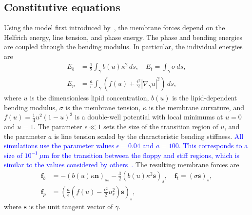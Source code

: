 \documentclass[twoside,twocolumn,9pt]{article}
\newcommand{\ff}{\mathbf{f}}
\newcommand{\nn}{\mathbf{n}}
\renewcommand{\ss}{\mathbf{s}}
\begin{document}
\subsection{Constitutive equations\label{subsec:const_eq}}
Using the model first introduced by~\citet{liu-mar-li-vee-low2017}, the
membrane forces depend on the Helfrich energy, line tension, and phase
energy. The phase and bending energies are coupled through the bending
modulus. In particular, the individual energies are
\begin{align}
  E_b &= \frac{1}{2}\int_{\gamma} b(u) \kappa^2 \, ds, \quad
  E_t = \int_{\gamma} \sigma \, ds, \\
  E_p &= \frac{a}{\epsilon}\int_{\gamma}\left(
  f(u) +\frac{\epsilon^2}{2}|\nabla_\gamma u|^2\right) \, ds,
  \label{eqn:PhaseEnergy}
\end{align}
where $u$ is the dimensionless lipid concentration, $b(u)$ is the
lipid-dependent bending modulus, $\sigma$ is the membrane tension,
$\kappa$ is the membrane curvature, and $f(u) = \frac{1}{4}u^2(1-u)^2$
is a double-well potential with local minimums at $u=0$ and $u=1$. The
parameter $\epsilon \ll 1$ sets the size of the transition region of
$u$, and the parameter $a$ is line tension scaled by the characteristic
bending stiffness. 
\textcolor{blue}{
All simulations use the parameter values $\epsilon=0.04$ and $a=100$.
This corresponds to a size of $10^{-1}~\mu$m for the transition between
the floppy and stiff regions, which is similar to the values considered
by others~\cite{soh-tse-li-voi-low2010, liu-mar-li-vee-low2017,
Gera2018_SoftMatter}.
} 
The resulting membrane forces are
\begin{align}
  \ff_b &= -(b(u)\kappa \nn)_{ss} -\frac{3}{2}
    \left(b(u) \kappa^2 \ss\right)_s,  \quad
  \ff_t = (\sigma \ss)_s, \\
  \ff_p &= \left(\frac{a}{\epsilon}\left(f(u) -
     \frac{\epsilon^2}{2} u_s^2\right) \ss \right)_s,
\end{align}
where $\ss$ is the unit tangent vector of $\gamma$.
\end{document}

